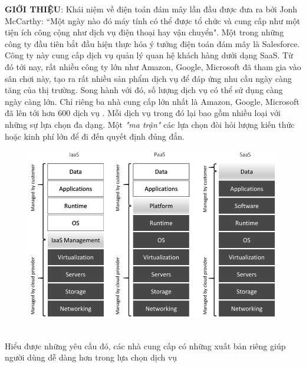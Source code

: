 \documentclass{article}
\begin{document}
\textbf{GIỚI THIỆU}: Khái niệm về điện toán đám mây lần đầu được đưa ra bởi Jonh McCarthy: “Một ngày nào đó máy tính có thể được tổ chức và cung cấp như một tiện ích công cộng như dịch vụ điện thoại hay vận chuyển"\cite{garfinkel1999architects}. Một trong những công ty đầu tiên bắt đầu hiện thực hóa ý tưởng điện toán đám mây là Salesforce. Công ty này cung cấp dịch vụ quản lý quan hệ khách hàng dưới dạng SaaS\footnotemark {}. Từ đó tới nay, rất nhiều công ty lớn như Amazon, Google, Microsoft đã tham gia vào sân chơi này, tạo ra rất nhiều sản phẩm dịch vụ để đáp ứng nhu cầu ngày càng tăng của thị trường. Song hành với đó, số lượng dịch vụ có thể sử dụng càng ngày càng lớn. Chỉ riêng ba nhà cung cấp lớn nhất là Amazon, Google, Microsoft đã lên tới hơn 600 dịch vụ \cite{amazon2023whatis,googlecloud2023product,Azure2023WhatisAzure}. Mỗi dịch vụ trong đó lại bao gồm nhiều loại với những sự lựa chọn đa dạng. Một \textit{"ma trận"} các lựa chọn đòi hỏi lượng kiến thức hoặc kinh phí lớn để đi đến quyết định đúng đắn.
\begin{figure}[h!]
  \centering
  \includegraphics[scale=0.3]{imgs/cloud-services.png}
  \label{fig:cloud-services}
\end{figure} \\
Hiểu được những yêu cầu đó, các nhà cung cấp có những xuất bản riêng \cite{geewax2018google, wittig2018amazon} giúp người dùng dễ dàng hơn trong lựa chọn dịch vụ


\printbibliography[heading=bibintoc, title = {TÀI LIỆU THAM KHẢO}]
\end{document}
